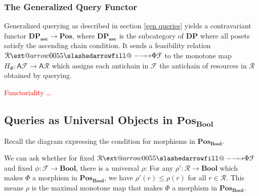 \documentclass[12pt]{article}
\makeatletter
\theoremstyle{definition}
\theoremstyle{plain}
\theoremstyle{plain}
\theoremstyle{plain}
\theoremstyle{plain}
\theoremstyle{remark}
\theoremstyle{remark}
\newcommand{\mc}[1]{\mathcal{#1}}
\def\slashedarrowfill@#1#2#3#4#5{%
	$\m@th\thickmuskip0mu\medmuskip\thickmuskip\thinmuskip\thickmuskip
	\relax#5#1\mkern-7mu%
	\cleaders\hbox{$#5\mkern-2mu#2\mkern-2mu$}\hfill
	\mathclap{#3}\mathclap{#2}%
	\cleaders\hbox{$#5\mkern-2mu#2\mkern-2mu$}\hfill
	\mkern-7mu#4$%
}
\def\rightslashedarrowfill@{%
	\slashedarrowfill@\relbar\relbar\mapstochar\rightarrow}
\newcommand\xslashedrightarrow[2][]{%
	\ext@arrow 0055{\rightslashedarrowfill@}{#1}{#2}}
\makeatother
\begin{document}
\subsubsection{The Generalized Query Functor}

Generalized querying as described in section \ref{gen queries} yields a contravariant functor $\mathbf{DP_\text{asc}} \rightarrow \mathbf{Pos}$, where $\mathbf{DP_\text{asc}}$ is the subcategory of $\mathbf{DP}$ where all posets satisfy the ascending chain condition. It sends a feasibility relation $\mc{R} \xslashedrightarrow{\Phi} \mc{F}$ to the monotone map $H_\Phi: \mathsf{A}\mc{F} \rightarrow \mathsf{A}\mc{R}$ which assigns each antichain in $\mc{F}$ the antichain of resources in $\mc{R}$ obtained by querying.

\textcolor{red}{Functoriality \ldots}

\subsection{Queries as Universal Objects in $\mathbf{Pos_{Bool}}$}

Recall the diagram expressing the condition for morphisms in $\mathbf{Pos_{Bool}}$.

\begin{center}
\end{center}

We can ask whether for fixed $\mc{R} \xslashedrightarrow{\Phi} \mc{F}$ and fixed $\phi: \mc{F} \rightarrow \mathbf{Bool}$, there is a universal $\rho$:  For any $\rho': \mc{R} \rightarrow \mathbf{Bool}$ which makes $\Phi$ a morphism in $\mathbf{Pos_{Bool}}$, we have $\rho'(r) \leq \rho(r)$ for all $r \in \mc{R}$. This means $\rho$ is the maximal monotone map that makes $\Phi$ a morphism in $\mathbf{Pos_{Bool}}$. 

\begin{center}
\end{center}
\end{document}
